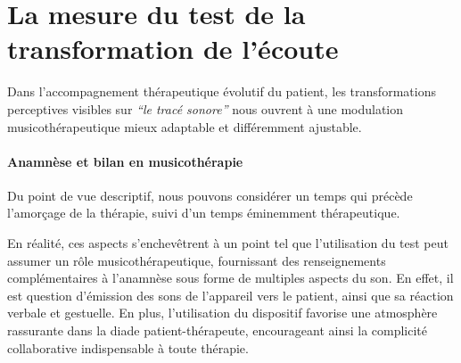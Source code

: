  
\section{La mesure du test de la trans\-for\-ma\-tion de l'écoute}
Dans l'accompagnement thérapeutique évolutif du patient, 
 les transformations perceptives visibles sur 
\textit{``le tracé sonore''} nous ouvrent à une modulation
musicothérapeutique mieux adaptable et différemment ajustable.

 

\paragraph{\textbf{Anamnèse et bilan en musicothérapie}}
Du point de vue descriptif, nous pouvons considérer un temps qui
précède 
l'amorçage de la thérapie, suivi d'un temps éminemment thérapeutique.


En réalité, ces aspects s'enchevêtrent à un point tel que
l'utilisation du test peut assumer un rôle musicothérapeutique, fournissant des
  renseignements complémentaires à l'anamnèse sous forme de multiples
  aspects du son. En effet, il est  question d'émission des sons de
  l'appareil vers le patient, ainsi que sa réaction verbale et gestuelle.
En plus, l'utilisation
   du dispositif favorise une atmosphère rassurante dans la diade
   patient-thérapeute, encourageant ainsi la complicité collaborative 
 indispensable à toute
 thérapie.

